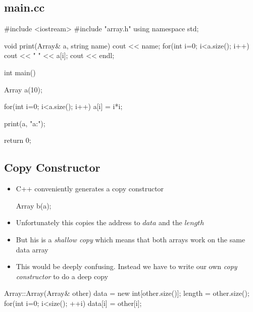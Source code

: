 
\begin{slide}
\section[-2]{main.cc}

\begin{cpp}
#include <iostream>
#include "array.h"
using namespace std;

void print(Array& a, string name) {
  cout << name;
  for(int i=0; i<a.size(); i++) {
    cout << " " << a[i];
  }
  cout << endl;
}

int main() {
  Array a(10);

  for(int i=0; i<a.size(); i++) {
    a[i] = i*i;
  }

  print(a, "a:");

  return 0;
}
\end{cpp}
\end{slide}


\begin{slide}
\section[-2]{Copy Constructor}

\begin{itemize}
\item C++ conveniently generates a copy constructor
  \begin{cpp}
    Array b(a);
  \end{cpp}
\item Unfortunately this copies the address to \jl$data$ and the
  \jl$length$
\item But his is a \textit{shallow copy} which means that both arrays
  work on the same data array
\item This would be deeply confusing.  Instead we have to write our
  own \textit{copy constructor} to do a deep copy
\end{itemize}
\begin{cpp}
Array::Array(Array& other) {
  data = new int[other.size()];
  length = other.size();
  for(int i=0; i<size(); ++i) {
    data[i] = other[i];
  }
}
\end{cpp}
\end{slide}
